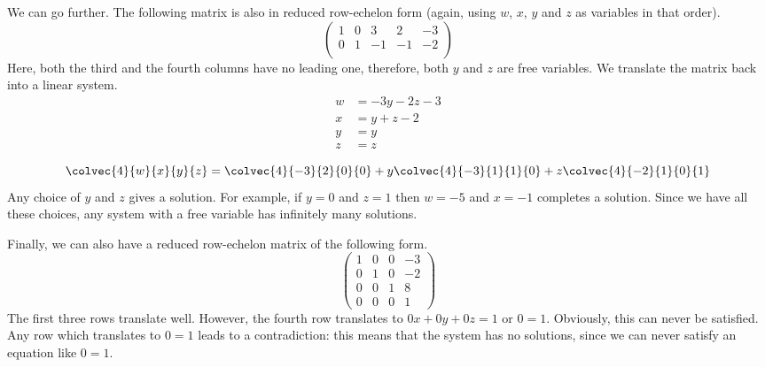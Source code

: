 \documentclass[fleqn]{report}
\begin{document}
\begin{example}
We can go further. The following matrix is also in reduced
row-echelon form (again, using $w$, $x$, $y$ and $z$ as
variables in that order).
\begin{displaymath}
\left(
\begin{array}{cccc|c}
1 & 0 & 3 & 2 & -3 \\
0 & 1 & -1 & -1 & -2 \\
\end{array}
\right)
\end{displaymath}
Here, both the third and the fourth columns have no leading
one, therefore, both $y$ and $z$ are free variables. We
translate the matrix back into a linear system.
\begin{align*}
w & = -3y - 2z - 3 \\
x & = y+z-2 \\
y & = y \\
z & = z \\
\end{align*}
\begin{equation*}
\colvec{4}{w}{x}{y}{z} = \colvec{4}{-3}{2}{0}{0} 
+ y \colvec{4}{-3}{1}{1}{0}
+ z \colvec{4}{-2}{1}{0}{1}
\end{equation*}
Any choice of $y$ and $z$ gives a solution. For example, if
$y=0$ and $z=1$ then $w=-5$ and $x=-1$ completes a solution.
Since we have all these choices, any system with a free variable
has infinitely many solutions.
\end{example}

\begin{example}
Finally, we can also have a reduced row-echelon matrix of the
following form.
\begin{displaymath}
\left(
\begin{array}{ccc|c}
1 & 0 & 0 & -3 \\
0 & 1 & 0 & -2 \\
0 & 0 & 1 & 8 \\
0 & 0 & 0 & 1
\end{array}
\right)
\end{displaymath}
The first three rows translate well. However, the fourth row
translates to $0x+0y+0z = 1$ or $0=1$. Obviously, this can
never be satisfied. Any row which translates to $0=1$ leads to
a contradiction: this means that the system has no solutions,
since we can never satisfy an equation like $0=1$. 
\end{example}
\end{document}
